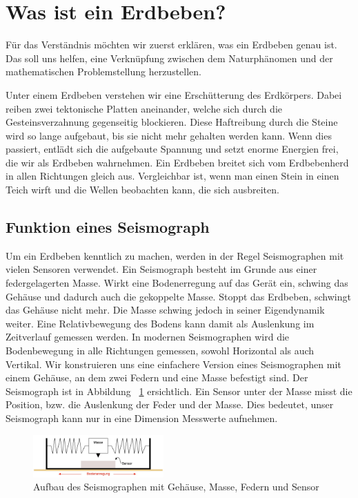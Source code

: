 %
%
\section{Was ist ein Erdbeben? \label{erdbeben:section:teil0}}
Für das Verständnis möchten wir zuerst erklären, was ein Erdbeben genau ist.
Das soll uns helfen, eine Verknüpfung zwischen dem Naturphänomen und der mathematischen Problemstellung herzustellen.

Unter einem Erdbeben verstehen wir eine Erschütterung des Erdkörpers.
Dabei reiben zwei tektonische Platten aneinander, welche sich durch die Gesteinsverzahnung gegenseitig blockieren.
Diese Haftreibung durch die Steine wird so lange aufgebaut, bis sie nicht mehr gehalten werden kann.
Wenn dies passiert, entlädt sich die aufgebaute Spannung und setzt enorme Energien frei, die wir als Erdbeben wahrnehmen.
Ein Erdbeben breitet sich vom Erdbebenherd in allen Richtungen gleich aus.
Vergleichbar ist, wenn man einen Stein in einen Teich wirft und die Wellen beobachten kann, die sich ausbreiten.

\subsection{Funktion eines Seismograph}
Um ein Erdbeben kenntlich zu machen, werden in der Regel Seismographen mit vielen Sensoren verwendet. 
Ein Seismograph besteht im Grunde aus einer federgelagerten Masse. Wirkt eine Bodenerregung auf das Gerät ein, schwing das Gehäuse und dadurch auch die gekoppelte Masse. 
Stoppt das Erdbeben, schwingt das Gehäuse nicht mehr. 
Die Masse schwing jedoch in seiner Eigendynamik weiter. 
Eine Relativbewegung des Bodens kann damit als Auslenkung im Zeitverlauf gemessen werden.
In modernen Seismographen wird die Bodenbewegung in alle Richtungen gemessen, sowohl Horizontal als auch Vertikal. 
Wir konstruieren uns eine einfachere Version eines Seismographen mit einem Gehäuse, an dem zwei Federn und eine Masse befestigt sind. 
Der Seismograph ist in Abbildung ~\ref{erdbeben:Seismograph} ersichtlich.
Ein Sensor unter der Masse misst die Position, bzw. die Auslenkung der Feder und der Masse.
Dies bedeutet, unser Seismograph kann nur in eine Dimension Messwerte aufnehmen. 

\begin{figure}
 \begin{center}
 \includegraphics[width=5cm]{papers/erdbeben/Apperatur}
 \caption{Aufbau des Seismographen mit Gehäuse, Masse, Federn und Sensor}
 \label{erdbeben:Seismograph}
 \end{center}
\end{figure}

